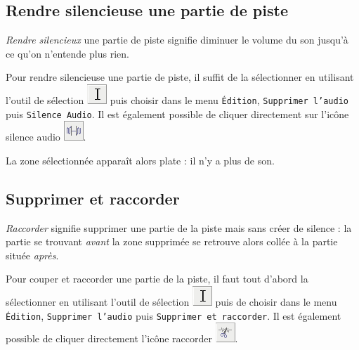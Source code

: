 \subsection{Rendre silencieuse une partie de piste}\label{Son1silence}

\emph{Rendre silencieux} une partie de piste signifie diminuer le volume du son jusqu'à ce qu'on n'entende plus rien.

Pour rendre silencieuse une partie de piste, il suffit de la sélectionner en utilisant l'outil de sélection \includegraphics[width=.5cm]{./images/son01/audacityIconeSelection} puis choisir dans le menu \texttt{Édition}, \texttt{Supprimer l'audio} puis \texttt{Silence Audio}. Il est également possible de cliquer directement sur l'icône silence audio \includegraphics[width=.5cm]{./images/son01/audacityIconeSilence}.


La zone sélectionnée apparaît alors plate : il n'y a plus de son.





\subsection{Supprimer et raccorder}\label{Son1couperRaccorder} 

\emph{Raccorder} signifie supprimer une partie de la piste mais sans créer de silence : la partie se trouvant \emph{avant} la zone supprimée se retrouve alors collée à la partie située \emph{après}.

Pour couper et raccorder une partie de la piste, il faut tout d'abord la sélectionner en utilisant l'outil de sélection \includegraphics[width=.5cm]{./images/son01/audacityIconeSelection} puis de choisir dans le menu \texttt{Édition}, \texttt{Supprimer l'audio} puis \texttt{Supprimer et raccorder}. Il est également possible de cliquer directement l'icône raccorder \includegraphics[width=.5cm]{./images/son01/audacityIconeRaccorder}.

